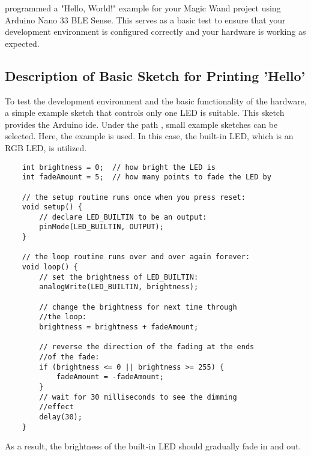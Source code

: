 programmed a "Hello, World!" example for your Magic Wand project using Arduino Nano 33 BLE Sense. This serves as a basic test to ensure that your development environment is configured correctly and your hardware is working as expected.


\subsection{Description of Basic Sketch for Printing 'Hello'}

To test the development environment and the basic functionality of the hardware, a simple example sketch that controls only one LED is suitable. This sketch provides the Arduino \ac{ide}. Under the path , small example sketches can be selected. Here, the example  is used. In this case, the built-in LED, which is an RGB LED, is utilized. 


\begin{lstlisting}
    int brightness = 0;  // how bright the LED is
    int fadeAmount = 5;  // how many points to fade the LED by
    
    // the setup routine runs once when you press reset:
    void setup() {
        // declare LED_BUILTIN to be an output:
        pinMode(LED_BUILTIN, OUTPUT);
    }
    
    // the loop routine runs over and over again forever:
    void loop() {
        // set the brightness of LED_BUILTIN:
        analogWrite(LED_BUILTIN, brightness);
        
        // change the brightness for next time through 
        //the loop:
        brightness = brightness + fadeAmount;
        
        // reverse the direction of the fading at the ends 
        //of the fade:
        if (brightness <= 0 || brightness >= 255) {
            fadeAmount = -fadeAmount;
        }
        // wait for 30 milliseconds to see the dimming 
        //effect
        delay(30);
    }
\end{lstlisting}


As a result, the brightness of the built-in LED should gradually fade in and out.

